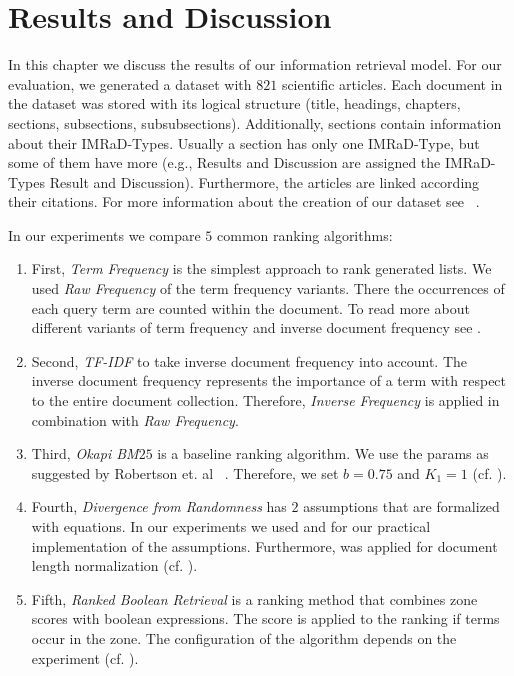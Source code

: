 \chapter{Results and Discussion}
\label{cha:results_discussion}

In this chapter we discuss the results of our information retrieval model. For our evaluation, we generated a dataset with $821$ scientific articles. Each document in the dataset was stored with its logical structure (title, headings, chapters, sections, subsections, subsubsections). Additionally, sections contain information about their IMRaD-Types. Usually a section has only one IMRaD-Type, but some of them have more (e.g., Results and Discussion are assigned the IMRaD-Types Result and Discussion). Furthermore, the articles are linked according their citations. For more information about the creation of our dataset see ~.

In our experiments we compare $5$ common ranking algorithms:
\begin{enumerate}
  \item First, \textit{Term Frequency} is the simplest approach to rank generated lists. We used \textit{Raw Frequency} of the term frequency variants. There the occurrences of each query term are counted within the document. To read more about different variants of term frequency and inverse document frequency see .
  \item Second, \textit{TF-IDF} to take inverse document frequency into account. The inverse document frequency represents the importance of a term with respect to the entire document collection. Therefore, \textit{Inverse Frequency} is applied in combination with \textit{Raw Frequency}.
  \item Third, \textit{Okapi BM$25$} is a baseline ranking algorithm. We use the params as suggested by Robertson et. al ~\cite{RobertsonWJHG94}. Therefore, we set $b=0.75$ and $K_1 = 1$ (cf. ).
  \item Fourth, \textit{Divergence from Randomness} has $2$ assumptions that are formalized with equations. In our experiments we used  and  for our practical implementation of the assumptions. Furthermore,  was applied for document length normalization (cf. ). 
  \item Fifth, \textit{Ranked Boolean Retrieval} is a ranking method that combines zone scores with boolean expressions. The score is applied to the ranking if terms occur in the zone. The configuration of the algorithm depends on the experiment (cf. ).
\end{enumerate}

